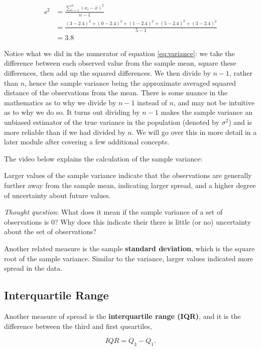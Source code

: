 \documentclass[
]{book}
\begin{document}
\[
\begin{split}
s^2 &= \frac{\sum_{i=1}^n (x_i-\bar{x})^2}{n-1}\\
 &= \frac{(3-2.4)^2 + (0-2.4)^2 + (1-2.4)^2 + (5-2.4)^2 + (3-2.4)^2}{5-1} \\
&= 3.8 
\end{split}
\]

Notice what we did in the numerator of equation \eqref{eq:variance}: we take the difference between each observed value from the sample mean, square these differences, then add up the squared differences. We then divide by \(n-1\), rather than \(n\), hence the sample variance being the approximate averaged squared distance of the observations from the mean. There is some nuance in the mathematics as to why we divide by \(n-1\) instead of \(n\), and may not be intuitive as to why we do so. It turns out dividing by \(n-1\) makes the sample variance an unbiased estimator of the true variance in the population (denoted by \(\sigma^2\)) and is more reliable than if we had divided by \(n\). We will go over this in more detail in a later module after covering a few additional concepts.

The video below explains the calculation of the sample variance:

Larger values of the sample variance indicate that the observations are generally further away from the sample mean, indicating larger spread, and a higher degree of uncertainty about future values.

\emph{Thought question}: What does it mean if the sample variance of a set of observations is 0? Why does this indicate their there is little (or no) uncertainty about the set of observations?

Another related measure is the sample \textbf{standard deviation}, which is the square root of the sample variance. Similar to the variance, larger values indicated more spread in the data.

\subsection{Interquartile Range}\label{interquartile-range}

Another measure of spread is the \textbf{interquartile range (IQR)}, and it is the difference between the third and first queartiles,

\begin{equation} 
IQR = Q_3 - Q_1.
\label{eq:IQR}
\end{equation}
\end{document}

